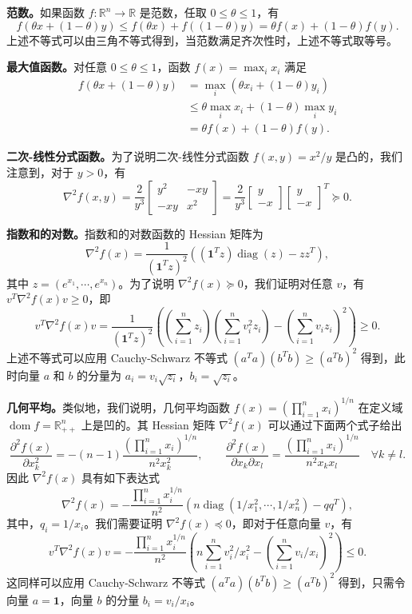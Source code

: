 \documentclass[UTF8, 12pt, fontset=fandol, oneside]{ctexart}
\DeclareMathOperator{\dom}{dom}
\DeclareMathOperator{\diag}{diag}
\begin{document}
\noindent\textbf{范数。}\quad 如果函数 $f:\mathbb{R}^n\to\mathbb{R}$ 是范数，任取 $0\leq\theta\leq1$，有
\[
f(\theta x+(1-\theta)y)\leq f(\theta x)+f((1-\theta)y)=\theta f(x)+(1-\theta)f(y).
\]
上述不等式可以由三角不等式得到，当范数满足齐次性时，上述不等式取等号。

\noindent\textbf{最大值函数。}\quad 对任意 $0\leq\theta\leq1$，函数 $f(x)=\max_i x_i$ 满足
\[
\begin{aligned}
f(\theta x+(1-\theta)y)
&=\max_i(\theta x_i+(1-\theta)y_i)\\
&\leq \theta\max_i x_i+(1-\theta)\max_i y_i\\
&=\theta f(x)+(1-\theta)f(y).
\end{aligned}
\]

\noindent\textbf{二次-线性分式函数。}\quad 为了说明二次-线性分式函数 $f(x,y)=x^2/y$ 是凸的，我们注意到，对于 $y>0$，有
\[
\nabla^2 f(x,y)=\frac{2}{y^3}
\begin{bmatrix}
y^2 & -xy\\
-xy & x^2
\end{bmatrix}
=\frac{2}{y^3}
\begin{bmatrix}
y\\
-x
\end{bmatrix}
\begin{bmatrix}
y\\
-x
\end{bmatrix}^T\succeq0.
\]

\noindent\textbf{指数和的对数。}\quad 指数和的对数函数的 Hessian 矩阵为
\[
\nabla^2 f(x)=\frac{1}{(\mathbf{1}^Tz)^2}\left((\mathbf{1}^Tz)\diag(z)-zz^T\right),
\]
其中 $z=(e^{x_1},\cdots,e^{x_n})$。为了说明 $\nabla^2 f(x)\succeq0$，我们证明对任意 $v$，有 $v^T\nabla^2 f(x)v\geq0$，即
\[
v^T\nabla^2 f(x)v
=\frac{1}{(\mathbf{1}^Tz)^2}\left(\left(\sum_{i=1}^n z_i\right)\left(\sum_{i=1}^n v_i^2z_i\right)-\left(\sum_{i=1}^n v_iz_i\right)^2\right)\geq0.
\]
上述不等式可以应用 Cauchy-Schwarz 不等式 $(a^Ta)(b^Tb)\geq(a^Tb)^2$ 得到，此时向量 $a$ 和 $b$ 的分量为 $a_i=v_i\sqrt{z_i}$，$b_i=\sqrt{z_i}$。

\noindent\textbf{几何平均。}\quad 类似地，我们说明，几何平均函数 $f(x)=\left(\prod_{i=1}^n x_i\right)^{1/n}$ 在定义域 $\dom f=\mathbb{R}_{++}^n$ 上是凹的。其 Hessian 矩阵 $\nabla^2 f(x)$ 可以通过下面两个式子给出
\[
\frac{\partial^2 f(x)}{\partial x_k^2}=-(n-1)\frac{\left(\prod_{i=1}^n x_i\right)^{1/n}}{n^2x_k^2},\qquad
\frac{\partial^2 f(x)}{\partial x_k\partial x_l}=
\frac{\left(\prod_{i=1}^n x_i\right)^{1/n}}{n^2x_kx_l}\quad \forall k\neq l.
\]
因此 $\nabla^2 f(x)$ 具有如下表达式
\[
\nabla^2 f(x)=-\frac{\prod_{i=1}^n x_i^{1/n}}{n^2}\left(n\diag(1/x_1^2,\cdots,1/x_n^2)-qq^T\right),
\]
其中，$q_i=1/x_i$。我们需要证明 $\nabla^2 f(x)\preceq0$，即对于任意向量 $v$，有
\[
v^T\nabla^2 f(x)v
=-\frac{\prod_{i=1}^n x_i^{1/n}}{n^2}\left(n\sum_{i=1}^n v_i^2/x_i^2-\left(\sum_{i=1}^n v_i/x_i\right)^2\right)\leq0.
\]
这同样可以应用 Cauchy-Schwarz 不等式 $(a^Ta)(b^Tb)\geq(a^Tb)^2$ 得到，只需令向量 $a=\mathbf{1}$，向量 $b$ 的分量 $b_i=v_i/x_i$。
\end{document}
